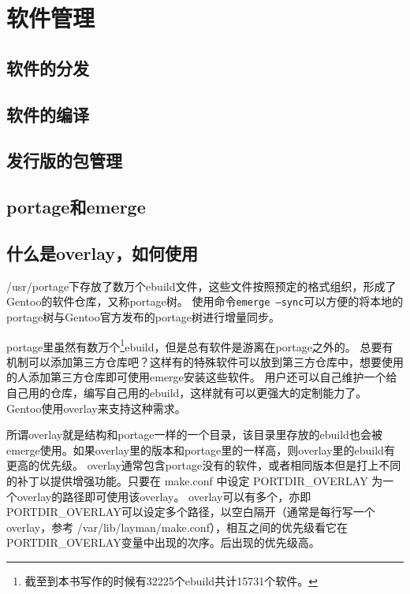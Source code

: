 \documentclass[amstex,twoside]{ctexbook}
\begin{document}


\chapter{软件管理}\label{软件管理}



\section{软件的分发}
\section{软件的编译}
\section{发行版的包管理}\label{section:pkgmgr}
\section{portage和emerge}\label{sec:emerge}

\section{什么是overlay，如何使用}\label{sec:overlay}

/usr/portage下存放了数万个ebuild文件，这些文件按照预定的格式组织，形成了Gentoo的软件仓库，又称portage树。
使用命令{\tt emerge --sync}可以方便的将本地的portage树与Gentoo官方发布的portage树进行增量同步。

portage里虽然有数万个\footnote{截至到本书写作的时候有32225个ebuild共计15731个软件。}ebuild，但是总有软件是游离在portage之外的。
总要有机制可以添加第三方仓库吧？这样有的特殊软件可以放到第三方仓库中，想要使用的人添加第三方仓库即可使用emerge安装这些软件。
用户还可以自己维护一个给自己用的仓库，编写自己用的ebuild，这样就有可以更强大的定制能力了。
Gentoo使用overlay来支持这种需求。

所谓overlay就是结构和portage一样的一个目录，该目录里存放的ebuild也会被emerge使用。如果overlay里的版本和portage里的一样高，则overlay里的ebuild有更高的优先级。
overlay通常包含portage没有的软件，或者相同版本但是打上不同的补丁以提供增强功能。只要在 make.conf 中设定 PORTDIR\_OVERLAY 为一个overlay的路径即可使用该overlay。
overlay可以有多个，亦即PORTDIR\_OVERLAY可以设定多个路径，以空白隔开（通常是每行写一个overlay，参考 /var/lib/layman/make.conf），相互之间的优先级看它在PORTDIR\_OVERLAY变量中出现的次序。后出现的优先级高。
\end{document}
